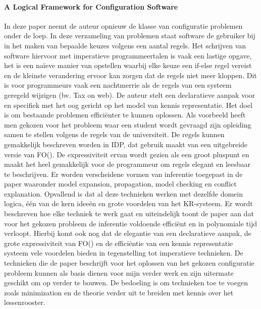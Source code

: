 \paragraph{A Logical Framework for Configuration Software \cite{vlaeminck2009logical}}
In deze paper neemt de auteur opnieuw de klasse van configuratie problemen onder de loep. In deze verzameling van problemen staat software de gebruiker bij in het maken van bepaalde keuzes volgens een aantal regels. Het schrijven van software hiervoor met imperatieve programmeertalen is vaak een lastige opgave, het is een na\"{i}eve manier van opstellen waarbij elke keuze een if-else regel vereist en de kleinste verandering ervoor kan zorgen dat de regels niet meer kloppen. Dit is voor programmeurs vaak een nachtmerrie als de regels van een systeem geregeld wijzigen (bv. Tax on web). De auteur stelt een declaratieve aanpak voor en specifiek met het oog gericht op het model van kennis representatie. Het doel is om bestaande problemen effici\"{e}nter te kunnen oplossen. Als voorbeeld heeft men gekozen voor het probleem waar een student wordt gevraagd zijn opleiding samen te stellen volgens de regels van de universiteit. De regels kunnen gemakkelijk beschreven worden in IDP, dat gebruik maakt van een uitgebreide versie van FO(\textperiodcentered). De expressiviteit ervan wordt gezien als een groot pluspunt en maakt het heel gemakkelijk voor de programmeur om regels elegant en leesbaar te beschrijven. Er worden verscheidene vormen van inferentie toegepast in de paper waaronder model expansion, propagation, model checking en conflict explanation. Opvallend is dat al deze technieken werken met dezelfde domein logica, \'{e}\'{e}n van de kern idee\"{e}n en grote voordelen van het KR-systeem. Er wordt beschreven hoe elke techniek te werk gaat en uiteindelijk toont de paper aan dat voor het gekozen probleem de inferentie voldoende effici\"{e}nt en in polynomiale tijd verloopt. Hierbij komt ook nog dat de elegantie van een declaratieve aanpak, de grote expressiviteit van FO(\textperiodcentered) en de effici\"{e}ntie van een kennis representatie systeem vele voordelen bieden in tegenstelling tot imperatieve technieken. De technieken die de paper beschrijft voor het oplossen van het gekozen configuratie probleem kunnen als basis dienen voor mijn verder werk en zijn uitermate geschikt om op verder te bouwen. De bedoeling is om technieken toe te voegen zoals minimization en de theorie verder uit te breiden met kennis over het lessenrooster. 


